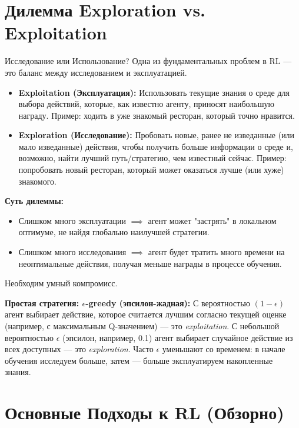 \section{Дилемма Exploration vs. Exploitation}

\begin{myexampleblock}{Исследование или Использование?}
    Одна из фундаментальных проблем в RL — это баланс между исследованием и эксплуатацией.
    \begin{itemize}
        \item \textbf{Exploitation (Эксплуатация):} Использовать текущие знания о среде для выбора действий, которые, как известно агенту, приносят наибольшую награду. Пример: ходить в уже знакомый ресторан, который точно нравится.
        \item \textbf{Exploration (Исследование):} Пробовать новые, ранее не изведанные (или мало изведанные) действия, чтобы получить больше информации о среде и, возможно, найти лучший путь/стратегию, чем известный сейчас. Пример: попробовать новый ресторан, который может оказаться лучше (или хуже) знакомого.
    \end{itemize}
    \textbf{Суть дилеммы:}
    \begin{itemize}
        \item Слишком много эксплуатации $\implies$ агент может "застрять" в локальном оптимуме, не найдя глобально наилучшей стратегии.
        \item Слишком много исследования $\implies$ агент будет тратить много времени на неоптимальные действия, получая меньше награды в процессе обучения.
    \end{itemize}
    Необходим умный компромисс.

    \textbf{Простая стратегия: $\epsilon$-greedy (эпсилон-жадная):}
    С вероятностью $(1-\epsilon)$ агент выбирает действие, которое считается лучшим согласно текущей оценке (например, с максимальным Q-значением) — это \textit{exploitation}. С небольшой вероятностью $\epsilon$ (эпсилон, например, 0.1) агент выбирает случайное действие из всех доступных — это \textit{exploration}. Часто $\epsilon$ уменьшают со временем: в начале обучения исследуем больше, затем — больше эксплуатируем накопленные знания.
\end{myexampleblock}

\section{Основные Подходы к RL (Обзорно)}

